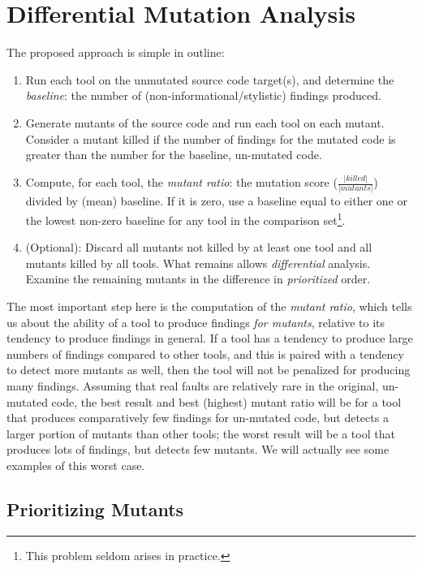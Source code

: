  \section{Differential Mutation Analysis}
 \label{sec:method}

The proposed approach is simple in outline:

\begin{enumerate}
\item Run each tool on the unmutated source code target(s), and determine the \emph{baseline}: the number of (non-informational/stylistic) findings produced.
\item Generate mutants of the source code and run each tool on each mutant.  Consider a mutant killed if the number of findings for the mutated code is greater than the number for the baseline, un-mutated code.
\item Compute, for each tool, the \emph{mutant ratio}:  the mutation score ($\frac{|\mathit{killed}|}{|\mathit{mutants}|}$) divided by (mean) baseline.  If it is zero, use a baseline equal to either one or the lowest non-zero baseline for any tool in the comparison set\footnote{This problem seldom arises in practice.}.
\item (Optional): Discard all mutants not killed by at least one tool and all mutants killed by all tools.  What remains allows \emph{differential} analysis.
Examine the remaining mutants in the difference in \emph{prioritized} order.
\end{enumerate}

The most important step here is the computation of the \emph{mutant ratio}, which tells us about the ability of a tool to produce findings \emph{for mutants}, relative to its tendency to produce findings in general.  If a tool has a tendency to produce large numbers of findings compared to other tools, and this is paired with a tendency to detect more mutants as well, then the tool will not be penalized for producing many findings.  Assuming that real faults are relatively rare in the original, un-mutated code, the best result and best (highest) mutant ratio will be for a tool that produces comparatively few findings for un-mutated code, but detects a larger portion of mutants than other tools; the worst result will be a tool that produces lots of findings, but detects few mutants.  We will actually see some examples of this worst case.

\subsection{Prioritizing Mutants}
\label{sec:prioritizing}

